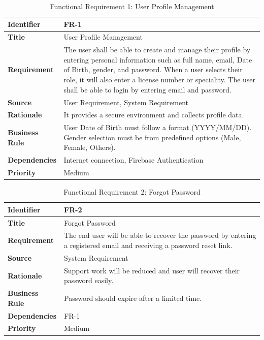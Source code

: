 \documentclass[12pt, a4paper, oneside]{report}
\begin{document}
\begin{table}[H]
\centering
\caption{Functional Requirement 1: User Profile Management}
\begin{tabularx}{\textwidth}{|l|X|}
\hline
\textbf{Identifier} & FR-1 \\ \hline
\textbf{Title} & User Profile Management \\ \hline
\textbf{Requirement} & The user shall be able to create and manage their profile by entering personal information such as full name, email, Date of Birth, gender, and password. When a user selects their role, it will also enter a license number or speciality. The user shall be able to login by entering email and password. \\ \hline
\textbf{Source} & User Requirement, System Requirement \\ \hline
\textbf{Rationale} & It provides a secure environment and collects profile data. \\ \hline
\textbf{Business Rule} & User Date of Birth must follow a format (YYYY/MM/DD). Gender selection must be from predefined options (Male, Female, Others). \\ \hline
\textbf{Dependencies} & Internet connection, Firebase Authentication \\ \hline
\textbf{Priority} & Medium \\ \hline
\end{tabularx}
\end{table}

\begin{table}[H]
\centering
\caption{Functional Requirement 2: Forgot Password}
\begin{tabularx}{\textwidth}{|l|X|}
\hline
\textbf{Identifier} & FR-2 \\ \hline
\textbf{Title} & Forgot Password \\ \hline
\textbf{Requirement} & The end user will be able to recover the password by entering a registered email and receiving a password reset link. \\ \hline
\textbf{Source} & System Requirement \\ \hline
\textbf{Rationale} & Support work will be reduced and user will recover their password easily. \\ \hline
\textbf{Business Rule} & Password should expire after a limited time. \\ \hline
\textbf{Dependencies} & FR-1 \\ \hline
\textbf{Priority} & Medium \\ \hline
\end{tabularx}
\end{table}
\end{document}
